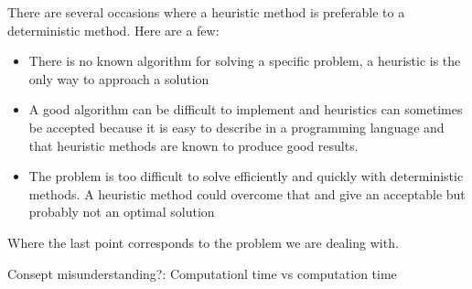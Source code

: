 There are several occasions where a heuristic method is preferable to a deterministic method.
Here are a few:
 
\begin{itemize}
\item There is no known algorithm for solving a specific problem, a heuristic is the only way to approach a solution
\item A good algorithm can be difficult to implement and heuristics can sometimes be accepted because it is easy to describe in a programming language and that heuristic methods are known to produce good results.

\item The problem is too difficult to solve efficiently and quickly with deterministic methods. A heuristic method could overcome that and give an acceptable but probably not an optimal solution

\end{itemize}
 
Where the last point corresponds to the problem we are dealing with.
 
Consept misunderstanding?:
Computationl time vs computation time